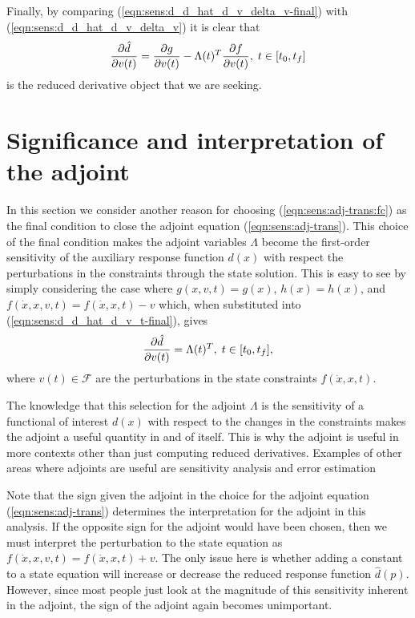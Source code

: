 \documentclass[pdf,ps2pdf,11pt]{SANDreport}
\begin{document}
Finally, by comparing (\ref{eqn:sens:d_d_hat_d_v_delta_v-final})
with (\ref{eqn:sens:d_d_hat_d_v_delta_v}) it is clear that
%
\begin{equation}
\displaystyle{\frac{\partial \hat{d}}{\partial v(t)}} = \displaystyle{\frac{\partial g}{\partial v(t)}} - \Lambda(t)^T \displaystyle{\frac{\partial f}{\partial v(t)}}, \; t\in[t_0,t_f]
\label{eqn:sens:d_d_hat_d_v_t-final}
\end{equation}
%
is the reduced derivative object that we are seeking.


%
\section{Significance and interpretation of the adjoint}
\label{sec:adjoint-interpretation}
%

In this section we consider another reason for choosing
(\ref{eqn:sens:adj-trans:fc}) as the final condition to close the
adjoint equation (\ref{eqn:sens:adj-trans}).  This choice of the
final condition makes the adjoint variables $\Lambda$ become the first-order
sensitivity of the auxiliary response function $d(x)$ with respect the
perturbations in the constraints through the state solution.  This is easy to
see by simply considering the case where $g(x,v,t) = g(x)$, $h(x) = h(x)$, and
$f(\dot{x},x,v,t) = f(\dot{x},x,t) - v$ which, when substituted into
(\ref{eqn:sens:d_d_hat_d_v_t-final}), gives
%
\begin{equation}
\displaystyle{\frac{\partial \hat{d}}{\partial v(t)}} = \Lambda(t)^T , \; t\in[t_0,t_f],
\label{eqn:sens:adjoint_interpretation}
\end{equation}
%
where $v(t)\in\mathcal{F}$ are the perturbations in the state constraints
$f(\dot{x},x,t)$.

The knowledge that this selection for the adjoint $\Lambda$ is the sensitivity
of a functional of interest $d(x)$ with respect to the changes in the
constraints makes the adjoint a useful quantity in and of itself.  This is why
the adjoint is useful in more contexts other than just computing reduced
derivatives.  Examples of other areas where adjoints are useful are
sensitivity analysis and error estimation
{}\cite{SensitivityTechnologiesSandReport}

Note that the sign given the adjoint in the choice for the adjoint equation
(\ref{eqn:sens:adj-trans}) determines the interpretation for the adjoint in
this analysis.  If the opposite sign for the adjoint would have been chosen,
then we must interpret the perturbation to the state equation as
$f(\dot{x},x,v,t) = f(\dot{x},x,t) + v$.  The only issue here is whether
adding a constant to a state equation will increase or decrease the reduced
response function $\hat{d}(p)$.  However, since most people just look at the
magnitude of this sensitivity inherent in the adjoint, the sign of the adjoint
again becomes unimportant.
\end{document}
